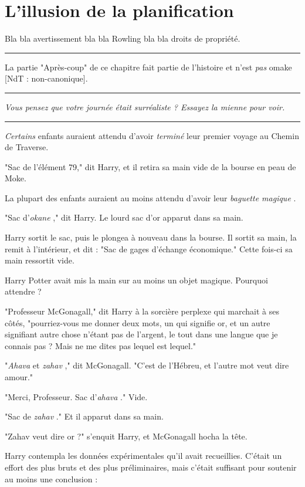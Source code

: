 
\chapter{L'illusion de la planification}

Bla bla avertissement bla bla Rowling bla bla droits de propriété.
\par\noindent\rule{\textwidth}{0.4pt}
La partie "Après-coup" de ce chapitre fait partie de l'histoire et n'est \emph{pas}  omake [NdT : non-canonique].
\par\noindent\rule{\textwidth}{0.4pt}
\emph{Vous pensez que votre journée était surréaliste ? Essayez la mienne pour voir.} 
\par\noindent\rule{\textwidth}{0.4pt}
\emph{Certains } enfants auraient attendu d'avoir \emph{terminé}  leur premier voyage au Chemin de Traverse.

"Sac de l'élément 79," dit Harry, et il retira sa main vide de la bourse en peau de Moke.

La plupart des enfants auraient au moins attendu d'avoir leur \emph{baguette magique} .

"Sac d'\emph{okane} ," dit Harry. Le lourd sac d'or apparut dans sa main.

Harry sortit le sac, puis le plongea à nouveau dans la bourse. Il sortit sa main, la remit à l'intérieur, et dit : "Sac de gages d'échange économique." Cette fois-ci sa main ressortit vide.

Harry Potter avait mis la main sur au moins un objet magique. Pourquoi attendre ?

"Professeur McGonagall," dit Harry à la sorcière perplexe qui marchait à ses côtés, "pourriez-vous me donner deux mots, un qui signifie or, et un autre signifiant autre chose n'étant pas de l'argent, le tout dans une langue que je connais pas ? Mais ne me dites pas lequel est lequel."

"\emph{Ahava } et \emph{zahav} ," dit McGonagall. "C'est de l'Hébreu, et l'autre mot veut dire amour."

"Merci, Professeur. Sac d'\emph{ahava} ." Vide.

"Sac de \emph{zahav} ." Et il apparut dans sa main.

"Zahav veut dire or ?" s'enquit Harry, et McGonagall hocha la tête.

Harry contempla les données expérimentales qu'il avait recueillies. C'était un effort des plus bruts et des plus préliminaires, mais c'était suffisant pour soutenir au moins une conclusion :

